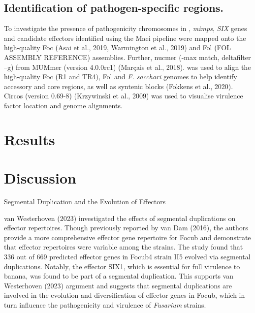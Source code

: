 \subsection{Identification of pathogen-specific regions.}
To investigate the presence of pathogenicity chromosomes in \Foc, \textit{mimps}, \textit{SIX} genes and candidate effectors identified using the Maei pipeline were mapped onto the high-quality Foc (Asai et al., 2019, Warmington et al., 2019) and Fol (FOL ASSEMBLY REFERENCE) assemblies. Further, nucmer (-max match, deltafilter –g) from MUMmer (version 4.0.0rc1) (Marçais et al., 2018). was used to align the high-quality Foc (R1 and TR4), Fol and \textit{F. sacchari} genomes to help identify accessory and core regions, as well as syntenic blocks (Fokkens et al., 2020). Circos (version 0.69-8) (Krzywinski et al., 2009) was used to visualise virulence factor location and genome alignments. 

\section{Results}

\section{Discussion}

\ac{Segmental Duplication and the Evolution of Effectors}

van Westerhoven \et (2023) investigated the effects of segmental duplications on effector repertoires.  Though previously reported by van Dam \et (2016), the authors provide a more comprehensive effector gene repertoire for \ac{Focub} and demonstrate that effector repertoires were variable among the strains. The study found that 336 out of 669 predicted effector genes in \ac{Focub4} strain II5 evolved via segmental duplications. Notably, the effector SIX1, which is essential for full virulence to banana, was found to be part of a segmental duplication. This supports van Westerhoven \et (2023) argument and suggests that segmental duplications are involved in the evolution and diversification of effector genes in \ac{Focub}, which in turn influence the pathogenicity and virulence of \textit{Fusarium} strains.